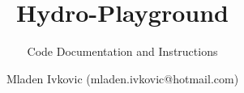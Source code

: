 



\title{Hydro-Playground}
\subtitle{Code Documentation and Instructions}
\author{Mladen Ivkovic (mladen.ivkovic@hotmail.com)}
\date{}









	



\maketitle
\newpage
\tableofcontents
\newpage









% 
% 
% 
% 
% 
% 
% 
% 
% 
% 




















% 








